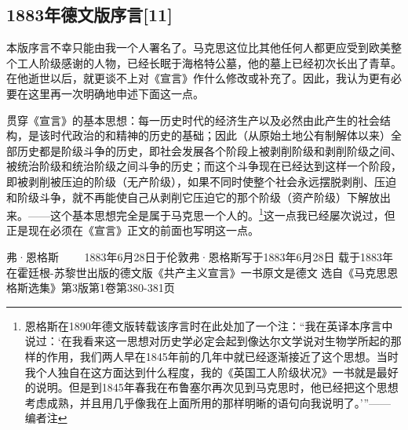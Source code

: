 \documentclass[UTF8,zihao=-4,a4paper]{ctexart}
\begin{document}
\subsection*{1883年德文版序言[11]}
本版序言不幸只能由我一个人署名了。马克思这位比其他任何人都更应受到欧美整个工人阶级感谢的人物，已经长眠于海格特公墓，他的墓上已经初次长出了青草。在他逝世以后，就更谈不上对《宣言》作什么修改或补充了。因此，我认为更有必要在这里再一次明确地申述下面这一点。\par
贯穿《宣言》的基本思想：每一历史时代的经济生产以及必然由此产生的社会结构，是该时代政治的和精神的历史的基础；因此（从原始土地公有制解体以来）全部历史都是阶级斗争的历史，即社会发展各个阶段上被剥削阶级和剥削阶级之间、被统治阶级和统治阶级之间斗争的历史；而这个斗争现在已经达到这样一个阶段，即被剥削被压迫的阶级（无产阶级），如果不同时使整个社会永远摆脱剥削、压迫和阶级斗争，就不再能使自己从剥削它压迫它的那个阶级（资产阶级）下解放出来。——这个基本思想完全是属于马克思一个人的。\footnote{恩格斯在1890年德文版转载该序言时在此处加了一个注：“我在英译本序言中说过：‘在我看来这一思想对历史学必定会起到像达尔文学说对生物学所起的那样的作用，我们两人早在1845年前的几年中就已经逐渐接近了这个思想。当时我个人独自在这方面达到什么程度，我的《英国工人阶级状况》一书就是最好的说明。但是到1845年春我在布鲁塞尔再次见到马克思时，他已经把这个思想考虑成熟，并且用几乎像我在上面所用的那样明晰的语句向我说明了。’”——编者注}这一点我已经屡次说过，但正是现在必须在《宣言》正文的前面也写明这一点。\par
弗·恩格斯 
 　　1883年6月28日于伦敦弗·恩格斯写于1883年6月28日 
 载于1883年在霍廷根-苏黎世出版的德文版《共产主义宣言》一书原文是德文 
 选自《马克思恩格斯选集》第3版第1卷第380-381页\par
\end{document}
